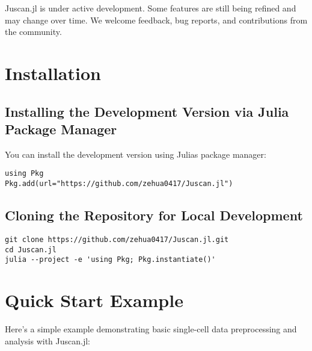 \documentclass[oneside]{memoir}
\begin{document}
\label{17041994431004078622}{}


Juscan.jl is under active development. Some features are still being refined and may change over time. We welcome feedback, bug reports, and contributions from the community.



\section{Installation}



\label{16848947351613073531}{}


\subsection{Installing the Development Version via Julia Package Manager}



\label{5101380886399676247}{}


You can install the development version using Julia{\textquotesingle}s package manager:




\begin{verbatim}
using Pkg
Pkg.add(url="https://github.com/zehua0417/Juscan.jl")
\end{verbatim}



\subsection{Cloning the Repository for Local Development}



\label{10997474127977679411}{}



\begin{verbatim}
git clone https://github.com/zehua0417/Juscan.jl.git
cd Juscan.jl
julia --project -e 'using Pkg; Pkg.instantiate()'
\end{verbatim}



\section{Quick Start Example}



\label{1185376811553284019}{}


Here’s a simple example demonstrating basic single-cell data preprocessing and analysis with Juscan.jl:
\end{document}

